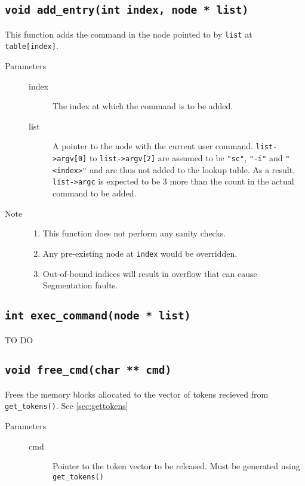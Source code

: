 \documentclass{article}
\begin{document}
\subsection{\lstinline{void add_entry(int index, node * list)}} \label{sec:addentry}
This function adds the command in the node pointed to by \lstinline{list} at \lstinline{table[index]}. 
\begin{description}
	\item[Parameters]\hfill
	\begin{description}
		\item[index] The index at which the command is to be added.
		\item[list] A pointer to the node with the current user command. \lstinline{list->argv[0]} to \lstinline{list->argv[2]} are assumed to be \lstinline{"sc"}, \lstinline{"-i"} and \lstinline{"<index>"} and are thus not added to the lookup table. As a result, \lstinline{list->argc} is expected to be 3 more than the count in the actual command to be added.
	\end{description}
	\item[Note]\hfill
		\begin{enumerate}
			\item This function does not perform any sanity checks. 
			\item Any pre-existing node at \lstinline{index} would be overridden. 
			\item Out-of-bound indices will result in overflow that can cause Segmentation faults.
		\end{enumerate}
\end{description}

\subsection{\lstinline{int exec_command(node * list)}} \label{sec:execcommand}
TO DO

\subsection{\lstinline{void free_cmd(char ** cmd)}} \label{sec:freecmd}
Frees the memory blocks allocated to the vector of tokens recieved from \lstinline{get_tokens()}. See \ref{sec:gettokens}
\begin{description}
	\item[Parameters]\hfill
	\begin{description}
		\item[cmd] Pointer to the token vector to be released. Must be generated using \lstinline{get_tokens()}
	\end{description}
\end{description}
\end{document}
